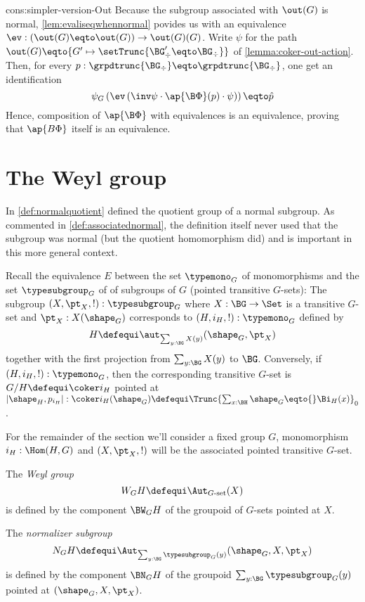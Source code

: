 \begin{implementation}{cons:simpler-version-Out}
  Because the subgroup associated with $\out(G)$ is normal,
  \cref{lem:evaliseqwhennormal} povides us with an equivalence
  $\ev : (\out(G) \eqto \out(G)) \to \out(G)(G)$. Write $\psi$ for the path
  $\out(G) \eqto {G' \mapsto \setTrunc{\BG'_\div \eqto \BG_\div}}$ of
  \cref{lemma:coker-out-action}. Then, for every
  $p:\grpdtrunc{\BG_\div} \eqto \grpdtrunc{\BG_\div}$, one get an identification
  \begin{displaymath}
    \psi_G \left(
      \ev \left( \inv\psi \cdot \ap{\B\Phi} (p) \cdot \psi \right)
    \right) \eqto \hat p
  \end{displaymath}
  Hence, composition of $\ap{\B\Phi}$ with equivalences is an equivalence,
  proving that $\ap{B\Phi}$ itself is an equivalence.
\end{implementation}


\section{The Weyl group}
\label{sec:Weyl}

In \cref{def:normalquotient} defined the quotient group of a normal subgroup.
As commented in \cref{def:associatednormal}, the definition itself never used that the subgroup was normal (but the quotient homomorphism did) and is important in this more general context.

Recall the equivalence $E$ between the set $\typemono_G$ of monomorphisms and the set $\typesubgroup_G$ of of subgroups of $G$ (pointed transitive $G$-sets): The subgroup $(X,\pt_X,!):\typesubgroup_G$ where $X:\BG\to\Set$ is a transitive $G$-set and $\pt_X:X(\shape_G)$ corresponds to $(H,i_H,!):\typemono_G$ defined by
$$H\defequi\aut_{\sum_{y:\BG}X(y)}(\shape_G,\pt_X)
$$ together with the first projection from $\sum_{y:\BG}X(y)$ to $\BG$.  Conversely, if $(H,i_H,!):\typemono_G$, then the corresponding transitive $G$-set is $G/H\defequi\coker i_H$ pointed at $|\shape_H,p_{i_H}|:\coker i_H(\shape_G)\defequi\Trunc{\sum_{x:\BH}\shape_G\eqto{}\Bi_H(x)}_0$.

For the remainder of the section we'll consider a fixed group $G$, monomorphism $i_H:\Hom(H,G)$ and $(X,\pt_X,!)$ will be the associated pointed transitive $G$-set.
\begin{definition}

The \emph{Weyl group} \label{def:Weyl}
$$W_GH\defequi\Aut_{G\text{-set}}(X)$$ is defined by the component $\BW_GH$ of the groupoid of $G$-sets pointed at $X$.

The \emph{normalizer subgroup} \label{def:normalizer}
$$N_GH\defequi\Aut_{\sum_{y:\BG}\typesubgroup_G(y)}(\shape_G,X,\pt_X)$$ is defined by the component $\BN_GH$ of the groupoid $\sum_{y:\BG}\typesubgroup_G(y)$ pointed at $(\shape_G,X,\pt_X)$.
\end{definition}


